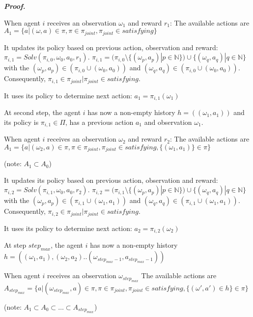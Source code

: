 \documentclass{ecai}
\newcounter{proof}
\renewcommand{\theproof}{\arabic{proof}}
\renewenvironment{proof}[1][]{
    \refstepcounter{proof}
    \noindent \raggedright \textit{\textbf{Proof. \theproof}}

    \setlength{\leftskip}{1em}

}
{

\
\setlength{\leftskip}{0pt}
}
\begin{document}
\begin{proof}
    When agent $i$ receives an observation $\omega_{1}$ and reward $r_1$:
    The available actions are $A_1 = \{a | (\omega, a) \in \pi, \pi \in \pi_{joint},\pi_{joint} \in satisfying\}$

    It updates its policy based on previous action, observation and reward: $\pi_{i,1} = Solv(\pi_{i,0}, \omega_0, a_0, r_1)$.
    $\pi_{i,1} = (\pi_{i,0} \setminus \{(\omega_p, a_p) | p \in \mathbb{N}\}) \cup \{(\omega_q, a_q) | q \in \mathbb{N}\}$ with the $(\omega_p, a_p) \in (\pi_{i,0} \cup {(\omega_0, a_0)})$ and $(\omega_q, a_q) \in (\pi_{i,0} \cup {(\omega_0, a_0)})$. Consequently, $\pi_{i,1} \in \pi_{joint} | \pi_{joint} \in satisfying$.


    It uses its policy to determine next action: $a_1 = \pi_{i,1}(\omega_1)$

    At second step, the agent $i$ has now a non-empty history $h = ((\omega_1, a_1))$ and its policy is $\pi_{i,1} \in \Pi$, has a previous action $a_1$ and observation $\omega_1$.

    When agent $i$ receives an observation $\omega_{2}$ and reward $r_2$:
    The available actions are $A_1 = \{a | (\omega_2, a) \in \pi, \pi \in \pi_{joint},\pi_{joint} \in satisfying, \{(\omega_1, a_1)\} \in \pi\}$

    (note: $A_1 \subset A_0$)

    It updates its policy based on previous action, observation and reward: $\pi_{i,2} = Solv(\pi_{i,1}, \omega_0, a_0, r_2)$.
    $\pi_{i,2} = (\pi_{i,1} \setminus \{(\omega_p, a_p) | p \in \mathbb{N}\}) \cup \{(\omega_q, a_q) | q \in \mathbb{N}\}$ with the $(\omega_p, a_p) \in (\pi_{i,1} \cup {(\omega_1, a_1)})$ and $(\omega_q, a_q) \in (\pi_{i,1} \cup {(\omega_1, a_1)})$. Consequently, $\pi_{i,2} \in \pi_{joint} | \pi_{joint} \in satisfying$.

    It uses its policy to determine next action: $a_2 = \pi_{i,2}(\omega_2)$

    At step $step_{max}$, the agent $i$ has now a non-empty history $h = ((\omega_1, a_1), (\omega_2, a_2)..(\omega_{step_{max}-1}, a_{step_{max}-1}))$

    When agent $i$ receives an observation $\omega_{step_{max}}$
    The available actions are $A_{step_{max}} = \{a | (\omega_{step_{max}}, a) \in \pi, \pi \in \pi_{joint},\pi_{joint} \in satisfying, \{(\omega', a') \in h\} \in \pi\}$

    (note: $A_1 \subset A_0 \subset \dots \subset A_{step_{max}}$)


\end{proof}
\end{document}
